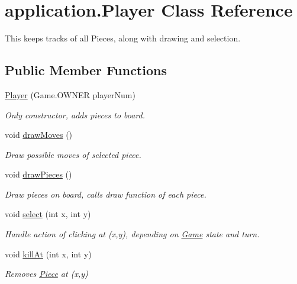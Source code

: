 \hypertarget{classapplication_1_1_player}{\section{application.\+Player Class Reference}
\label{classapplication_1_1_player}
}


This keeps tracks of all Pieces, along with drawing and selection.  


\subsection*{Public Member Functions}
\begin{DoxyCompactItemize}
\item 
\hyperlink{classapplication_1_1_player_a14ac1e2c788fb22e7e5be4e5e6bc1847}{Player} (Game.\+O\+W\+N\+E\+R player\+Num)
\begin{DoxyCompactList}\small\item\em Only constructor, adds pieces to board. \end{DoxyCompactList}\item 
\hypertarget{classapplication_1_1_player_a0fd6b813c9a0ab1e9844d0c13d709a44}{void \hyperlink{classapplication_1_1_player_a0fd6b813c9a0ab1e9844d0c13d709a44}{draw\+Moves} ()}\label{classapplication_1_1_player_a0fd6b813c9a0ab1e9844d0c13d709a44}

\begin{DoxyCompactList}\small\item\em Draw possible moves of selected piece. \end{DoxyCompactList}\item 
\hypertarget{classapplication_1_1_player_ad598f6c101732c33ced27c1ec23b7080}{void \hyperlink{classapplication_1_1_player_ad598f6c101732c33ced27c1ec23b7080}{draw\+Pieces} ()}\label{classapplication_1_1_player_ad598f6c101732c33ced27c1ec23b7080}

\begin{DoxyCompactList}\small\item\em Draw pieces on board, calls draw function of each piece. \end{DoxyCompactList}\item 
void \hyperlink{classapplication_1_1_player_abc096ccded0197ea0a5a87e09b55507e}{select} (int x, int y)
\begin{DoxyCompactList}\small\item\em Handle action of clicking at (x,y), depending on \hyperlink{classapplication_1_1_game}{Game} state and turn. \end{DoxyCompactList}\item 
void \hyperlink{classapplication_1_1_player_a82638976ae19fce3c6e03b589938abaa}{kill\+At} (int x, int y)
\begin{DoxyCompactList}\small\item\em Removes \hyperlink{classapplication_1_1_piece}{Piece} at (x,y) \end{DoxyCompactList}\end{DoxyCompactItemize}
